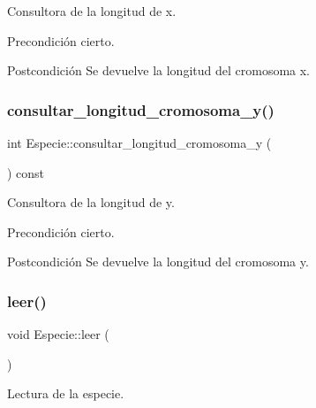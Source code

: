 Consultora de la longitud de x. 

\begin{DoxyPrecond}{Precondición}
cierto. 
\end{DoxyPrecond}
\begin{DoxyPostcond}{Postcondición}
Se devuelve la longitud del cromosoma x. 
\end{DoxyPostcond}
\mbox{\label{class_especie_a410b95f623a7013b96ec20039ca584b3}} 
\subsubsection{\texorpdfstring{consultar\+\_\+longitud\+\_\+cromosoma\+\_\+y()}{consultar\_longitud\_cromosoma\_y()}}
{\footnotesize\ttfamily int Especie\+::consultar\+\_\+longitud\+\_\+cromosoma\+\_\+y (\begin{DoxyParamCaption}{ }\end{DoxyParamCaption}) const}



Consultora de la longitud de y. 

\begin{DoxyPrecond}{Precondición}
cierto. 
\end{DoxyPrecond}
\begin{DoxyPostcond}{Postcondición}
Se devuelve la longitud del cromosoma y. 
\end{DoxyPostcond}
\mbox{\label{class_especie_a2335c9ddc4757e964d78e6267304cf52}} 
\subsubsection{\texorpdfstring{leer()}{leer()}}
{\footnotesize\ttfamily void Especie\+::leer (\begin{DoxyParamCaption}{ }\end{DoxyParamCaption})}



Lectura de la especie. 

